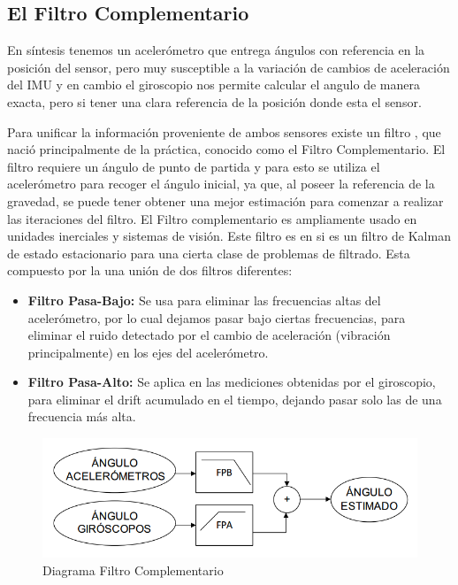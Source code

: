 \documentclass[12pt,a4paper]{article}
\begin{document}
\subsection{El Filtro Complementario}

En síntesis tenemos un acelerómetro que entrega ángulos con referencia en la posición del sensor, pero muy susceptible a la variación de cambios de aceleración del IMU y en cambio el giroscopio nos permite calcular el angulo de manera exacta, pero si tener una clara referencia de la posición donde esta el sensor. 

Para unificar la información proveniente de ambos sensores existe un filtro , que nació principalmente de la práctica, conocido como el Filtro Complementario.
El filtro requiere un ángulo de punto de partida y para esto se utiliza el acelerómetro para recoger el ángulo inicial, ya que, al poseer la referencia de la gravedad, se puede tener obtener una mejor estimación para comenzar a realizar las iteraciones del filtro.
\newline
El Filtro complementario es ampliamente usado en unidades inerciales y sistemas de visión. Este filtro es en si es un filtro de Kalman de estado estacionario para una cierta clase de problemas de filtrado.
Esta compuesto por la una unión de dos filtros diferentes:
\begin{itemize}
\item \textbf{Filtro Pasa-Bajo:} Se usa para eliminar las frecuencias altas del acelerómetro, por lo cual dejamos pasar bajo ciertas frecuencias, para eliminar el ruido detectado por el cambio de aceleración (vibración principalmente) en los ejes del acelerómetro.
\item \textbf{Filtro Pasa-Alto:} Se aplica en las mediciones obtenidas por el giroscopio, para eliminar el drift acumulado en el tiempo, dejando pasar solo las de una frecuencia más alta.
\end{itemize}

\begin{figure}[H]
\centering
	\includegraphics[scale=0.5]{images/FiltroComplementario}
	\caption{Diagrama Filtro Complementario}
    \label{fig:diagramafiltrocomplementario}
\end{figure}
\end{document}

